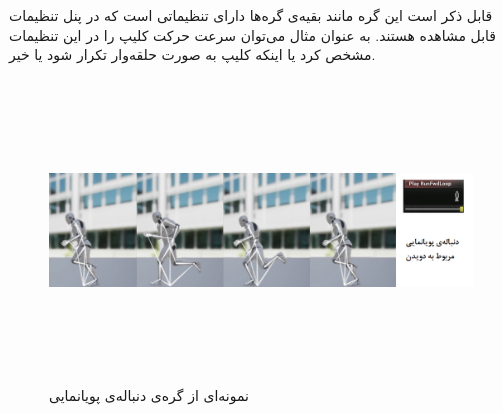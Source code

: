 قابل ذکر است این گره‌ مانند بقیه‌ی گره‌ها دارای تنظیماتی است که در پنل تنظیمات قابل مشاهده‌ هستند. به عنوان مثال 
می‌توان سرعت حرکت کلیپ را در این تنظیمات مشخص کرد یا اینکه کلیپ به صورت حلقه‌وار تکرار شود یا خیر.

\begin{figure}[ht]
	\centerline{\includegraphics[width=\textwidth,height=8cm,keepaspectratio]{Figures/Ch3/AnimationSequence.png}}

	\caption{نمونه‌ای از گره‌ی دنباله‌ی پویانمایی}
	\label{fig:AnimationSequence}
\end{figure}





